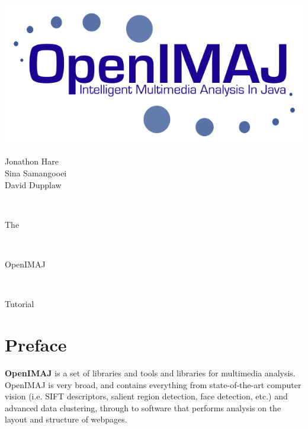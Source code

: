 \documentclass[10pt,a4paper,twoside,extrafontsizes]{memoir}
\newlength\titlepage
\newlength\titlepagefull
\begin{document}
	
\pagestyle{empty}

\begin{minipage}{0.5\titlepage}
\includegraphics{OpenIMAJ.png}
\end{minipage}
\hspace{0.001pt}
\begin{minipage}{0.5\titlepage}
\Huge
\flushright
Jonathon Hare\\
Sina Samangooei\\
David Dupplaw
\end{minipage}
\\[10cm]
\begin{minipage}{\titlepage}
\fontsize{60}{100}\selectfont\flushright The
\end{minipage}
\\[1cm]
\colorbox{nicered}{\parbox{\titlepagefull}{
	\parbox{\titlepage}{
		\color{white}\fontsize{80}{120}\selectfont\flushright OpenIMAJ\\[0.4cm]}
	}
}
\\[0.8cm]
\begin{minipage}{\titlepage}
\fontsize{60}{100}\selectfont\flushright Tutorial
\end{minipage}
\cleardoublepage


\tableofcontents*

\chapter*{Preface}\normalsize
{}
\pagestyle{plain}

\textbf{OpenIMAJ} is a set of libraries and tools and libraries for multimedia analysis. 
OpenIMAJ is very broad, and contains everything from state-of-the-art computer 
vision (i.e. SIFT descriptors, salient region detection, face detection, etc.) 
and advanced data clustering, through to software that performs analysis on the 
layout and structure of webpages.
\end{document}
